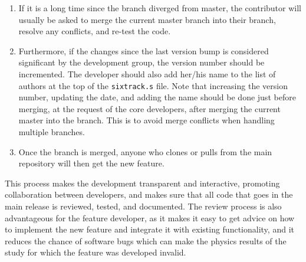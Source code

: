 \documentclass[english,BCOR=0mm,DIV=18]{scrartcl}
\begin{document}
\begin{enumerate}
\item If it is a long time since the branch diverged from master, the contributor will usually be asked to merge the current master branch into their branch, resolve any conflicts, and re-test the code.
\item Furthermore, if the changes since the last version bump is considered significant by the development group, the version number should be incremented.
      The developer should also add her/his name to the list of authors at the top of the \texttt{sixtrack.s} file.
      Note that increasing the version number, updating the date, and adding the name should be done just before merging, at the request of the core developers, after merging the current master into the branch.
      This is to avoid merge conflicts when handling multiple branches.
\item Once the branch is merged, anyone who clones or pulls from the main repository will then get the new feature.
\end{enumerate}
This process makes the development transparent and interactive, promoting collaboration between developers, and makes sure that all code that goes in the main release is reviewed, tested, and documented.
The review process is also advantageous for the feature developer, as it makes it easy to get advice on how to implement the new feature and integrate it with existing functionality, and it reduces the chance of software bugs which can make the physics results of the study for which the feature was developed invalid.
\end{document}
